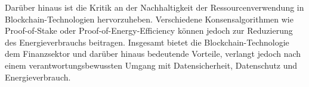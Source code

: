 Darüber hinaus ist die Kritik an der Nachhaltigkeit der Ressourcenverwendung in 
Blockchain-Technologien hervorzuheben. Verschiedene Konsensalgorithmen wie Proof-of-Stake 
oder Proof-of-Energy-Efficiency können jedoch zur Reduzierung des Energieverbrauchs 
beitragen. 
\newline
Insgesamt bietet die Blockchain-Technologie dem Finanzsektor und darüber hinaus bedeutende 
Vorteile, verlangt jedoch nach einem verantwortungsbewussten Umgang mit Datensicherheit, 
Datenschutz und Energieverbrauch.